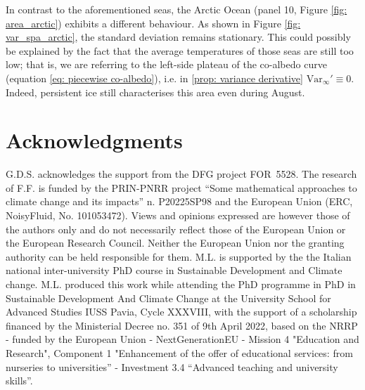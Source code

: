\documentclass[10pt]{amsart}
\numberwithin{equation}{section}
\begin{document}
In contrast to the aforementioned seas, the Arctic Ocean (panel 10, Figure \ref{fig: area_arctic}) exhibits a different behaviour. As shown in Figure \ref{fig: var_spa_arctic}, the standard deviation remains stationary. This could possibly be explained by the fact that the average temperatures of those seas are still too low; that is, we are referring to the left-side plateau of the co-albedo curve (equation \eqref{eq: piecewise co-albedo}), i.e. in \eqref{prop: variance derivative} $\mathrm{Var}_\infty'\equiv 0$. Indeed, persistent ice still characterises this area even during August. 


\section*{Acknowledgments}
G.D.S. acknowledges the support from the DFG project FOR~5528. The research of F.F. is funded by the PRIN-PNRR project “Some mathematical
approaches to climate change and its impacts” n. P20225SP98 and the European Union (ERC, NoisyFluid, No. 101053472). Views and opinions expressed are however those of the authors only and do not necessarily reflect those of the European Union or the European Research Council. Neither the European Union nor the granting authority can be held responsible for them. M.L. is supported by the the Italian national inter-university PhD course in Sustainable Development and Climate change. M.L. produced this work while attending the PhD programme in
PhD in Sustainable Development And Climate Change at the University School for Advanced Studies IUSS
Pavia, Cycle XXXVIII, with the support of a scholarship financed by the Ministerial Decree no. 351 of 9th
April 2022, based on the NRRP - funded by the European Union - NextGenerationEU - Mission 4 "Education
and Research", Component 1 "Enhancement of the offer of educational services: from nurseries to
universities” - Investment 3.4 “Advanced teaching and university skills”. 

%
%
\end{document}
